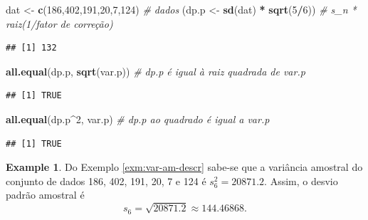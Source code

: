 \documentclass[
]{book}
\newenvironment{Shaded}{\begin{snugshade}}{\end{snugshade}}
\newcommand{\CommentTok}[1]{\textcolor[rgb]{0.56,0.35,0.01}{\textit{#1}}}
\newcommand{\DecValTok}[1]{\textcolor[rgb]{0.00,0.00,0.81}{#1}}
\newcommand{\KeywordTok}[1]{\textcolor[rgb]{0.13,0.29,0.53}{\textbf{#1}}}
\newcommand{\NormalTok}[1]{#1}
\newcommand{\OperatorTok}[1]{\textcolor[rgb]{0.81,0.36,0.00}{\textbf{#1}}}
\newcommand{\StringTok}[1]{\textcolor[rgb]{0.31,0.60,0.02}{#1}}
\theoremstyle{definition}
\theoremstyle{definition}
\newtheorem{example}{Example}[chapter]
\theoremstyle{definition}
\theoremstyle{remark}
\begin{document}
\begin{Shaded}
\begin{Highlighting}[]
\NormalTok{dat \textless{}{-}}\StringTok{ }\KeywordTok{c}\NormalTok{(}\DecValTok{186}\NormalTok{,}\DecValTok{402}\NormalTok{,}\DecValTok{191}\NormalTok{,}\DecValTok{20}\NormalTok{,}\DecValTok{7}\NormalTok{,}\DecValTok{124}\NormalTok{)    }\CommentTok{\# dados}
\NormalTok{(dp.p \textless{}{-}}\StringTok{ }\KeywordTok{sd}\NormalTok{(dat) }\OperatorTok{*}\StringTok{ }\KeywordTok{sqrt}\NormalTok{(}\DecValTok{5}\OperatorTok{/}\DecValTok{6}\NormalTok{))     }\CommentTok{\# s\_n * raiz(1/fator de correção)}
\end{Highlighting}
\end{Shaded}

\begin{verbatim}
## [1] 132
\end{verbatim}

\begin{Shaded}
\begin{Highlighting}[]
\KeywordTok{all.equal}\NormalTok{(dp.p, }\KeywordTok{sqrt}\NormalTok{(var.p))      }\CommentTok{\# \textquotesingle{}dp.p\textquotesingle{} é igual à raiz quadrada de \textquotesingle{}var.p\textquotesingle{}}
\end{Highlighting}
\end{Shaded}

\begin{verbatim}
## [1] TRUE
\end{verbatim}

\begin{Shaded}
\begin{Highlighting}[]
\KeywordTok{all.equal}\NormalTok{(dp.p}\OperatorTok{\^{}}\DecValTok{2}\NormalTok{, var.p)          }\CommentTok{\# \textquotesingle{}dp.p\textquotesingle{} ao quadrado é igual a \textquotesingle{}var.p\textquotesingle{}}
\end{Highlighting}
\end{Shaded}

\begin{verbatim}
## [1] TRUE
\end{verbatim}

\begin{example}
\protect\hypertarget{exm:dp-amostral}{}{\label{exm:dp-amostral} }Do Exemplo \ref{exm:var-am-descr} sabe-se que a variância amostral do conjunto de dados 186, 402, 191, 20, 7 e 124 é \(s^{2}_{6}= 20871.2\). Assim, o desvio padrão amostral é \[s_{6} = \sqrt{20871.2}  \approx 144.46868.\]
\end{example}
\end{document}
